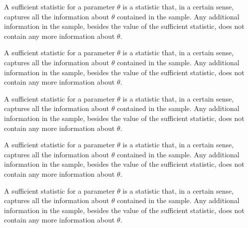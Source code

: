 A sufficient statistic for a parameter $\theta$ is a statistic that, in a certain sense, captures all the information about $\theta$ contained in the sample. Any additional information in the sample, besides the value of the sufficient statistic, does not contain any more information about $\theta$.

A sufficient statistic for a parameter $\theta$ is a statistic that, in a certain sense, captures all the information about $\theta$ contained in the sample. Any additional information in the sample, besides the value of the sufficient statistic, does not contain any more information about $\theta$.

A sufficient statistic for a parameter $\theta$ is a statistic that, in a certain sense, captures all the information about $\theta$ contained in the sample. Any additional information in the sample, besides the value of the sufficient statistic, does not contain any more information about $\theta$.

A sufficient statistic for a parameter $\theta$ is a statistic that, in a certain sense, captures all the information about $\theta$ contained in the sample. Any additional information in the sample, besides the value of the sufficient statistic, does not contain any more information about $\theta$.

A sufficient statistic for a parameter $\theta$ is a statistic that, in a certain sense, captures all the information about $\theta$ contained in the sample. Any additional information in the sample, besides the value of the sufficient statistic, does not contain any more information about $\theta$.

